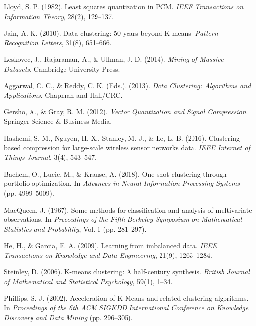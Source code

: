 \documentclass{article}
\begin{document}
\begin{thebibliography}{99}

Lloyd, S. P. (1982).
\newblock Least squares quantization in PCM.
\newblock \textit{IEEE Transactions on Information Theory}, 28(2), 129–137.

Jain, A. K. (2010).
\newblock Data clustering: 50 years beyond K-means.
\newblock \textit{Pattern Recognition Letters}, 31(8), 651–666.

Leskovec, J., Rajaraman, A., \& Ullman, J. D. (2014).
\newblock \textit{Mining of Massive Datasets}.
\newblock Cambridge University Press.

Aggarwal, C. C., \& Reddy, C. K. (Eds.). (2013).
\newblock \textit{Data Clustering: Algorithms and Applications}.
\newblock Chapman and Hall/CRC.

Gersho, A., \& Gray, R. M. (2012).
\newblock \textit{Vector Quantization and Signal Compression}.
\newblock Springer Science \& Business Media.

Hashemi, S. M., Nguyen, H. X., Stanley, M. J., \& Le, L. B. (2016).
\newblock Clustering-based compression for large-scale wireless sensor networks data.
\newblock \textit{IEEE Internet of Things Journal}, 3(4), 543–547.

Bachem, O., Lucic, M., \& Krause, A. (2018).
\newblock One-shot clustering through portfolio optimization.
\newblock In \textit{Advances in Neural Information Processing Systems} (pp. 4999–5009).

MacQueen, J. (1967).
\newblock Some methods for classification and analysis of multivariate observations.
\newblock In \textit{Proceedings of the Fifth Berkeley Symposium on Mathematical Statistics and Probability}, Vol. 1 (pp. 281–297).

He, H., \& Garcia, E. A. (2009).
\newblock Learning from imbalanced data.
\newblock \textit{IEEE Transactions on Knowledge and Data Engineering}, 21(9), 1263–1284.

Steinley, D. (2006).
\newblock K-means clustering: A half-century synthesis.
\newblock \textit{British Journal of Mathematical and Statistical Psychology}, 59(1), 1–34.

Phillips, S. J. (2002).
\newblock Acceleration of K-Means and related clustering algorithms.
\newblock In \textit{Proceedings of the 6th ACM SIGKDD International Conference on Knowledge Discovery and Data Mining} (pp. 296–305).


\end{thebibliography}
\end{document}
